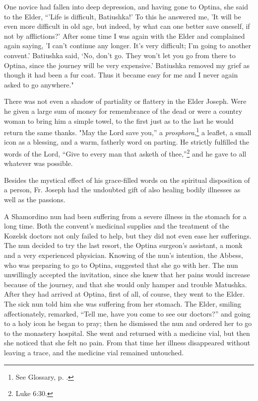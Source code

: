 One novice had fallen into deep depression, and having gone to Optina, she said to the Elder, “'Life is difficult, Batiushka!' To this he answered me, 'It will be even more difficult in old age, but indeed, by what can one better save oneself, if not by afflictions?' After some time I was again with the Elder and complained again saying, 'I can't continue any longer. It's very difficult; I'm going to another convent.' Batiushka said, ‘No, don't go. They won't let you go from there to Optina, since the journey will be very expensive.' Batiushka removed my grief as though it had been a fur coat. Thus it became easy for me and I never again asked to go anywhere."

There was not even a shadow of partiality or flattery in the Elder Joseph. Were he given a large sum of money for remembrance of the dead or were a country woman to bring him a simple towel, to the first just as to the last he would return the same thanks. "May the Lord save you,” a \textit{prosphora},\footnote{See Glossary, p. \pageref{prosphora}.} a leaflet, a small icon as a blessing, and a warm, fatherly word on parting. He strictly fulfilled the words of the Lord, “Give to every man that asketh of thee,''\footnote{Luke 6:30.} and he gave to all whatever was possible.

Besides the mystical effect of his grace-filled words on the spiritual disposition of a person, Fr. Joseph had the undoubted gift of also healing bodily illnesses as well as the passions.

A Shamordino nun had been suffering from a severe illness in the stomach for a long time. Both the convent's medicinal supplies and the treatment of the Kozelsk doctors not only failed to help, but they did not even ease her sufferings. The nun decided to try the last resort, the Optina surgeon's assistant, a monk and a very experienced physician. Knowing of the nun's intention, the Abbess, who was preparing to go to Optina, suggested that she go with her. The nun unwillingly accepted the invitation, since she knew that her pains would increase because of the journey, and that she would only hamper and trouble Matushka. After they had arrived at Optina, first of all, of course, they went to the Elder. The sick nun told him she was suffering from her stomach. The Elder, smiling affectionately, remarked, “Tell me, have you come to see our doctors?” and going to a holy icon he began to pray; then he dismissed the nun and ordered her to go to the monastery hospital. She went and returned with a medicine vial, but then she noticed that she felt no pain. From that time her illness disappeared without leaving a trace, and the medicine vial remained untouched.

